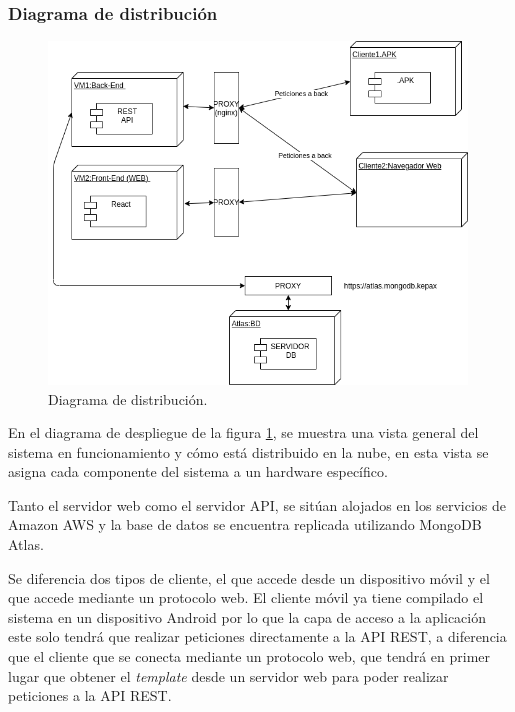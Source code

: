 \documentclass{article}
\begin{document}

\subsubsection*{Diagrama de distribución}

\begin{figure}[H]
    \centering
        \includegraphics[width=0.99\textwidth]{../images/despliegue.png}
    \caption{Diagrama de distribución.}
    \label{despliegue}
\end{figure}

En el diagrama de despliegue de la figura \ref{despliegue}, se muestra una vista general del sistema en funcionamiento y cómo está distribuido en la nube, en esta vista se asigna cada componente del sistema a un hardware específico.

Tanto el servidor web como el servidor API, se sitúan alojados en los servicios de Amazon AWS y la base de datos se encuentra replicada utilizando MongoDB Atlas.

Se diferencia dos tipos de cliente, el que accede desde un dispositivo móvil y el que accede mediante un protocolo web. El cliente móvil ya tiene compilado el sistema en un dispositivo Android por lo que la capa de acceso a la aplicación este solo tendrá que realizar peticiones directamente a la API REST, a diferencia que el cliente que se conecta mediante un protocolo web, que tendrá en primer lugar que obtener el \textit{template} desde un servidor web para poder realizar peticiones a la API REST.
\end{document}
